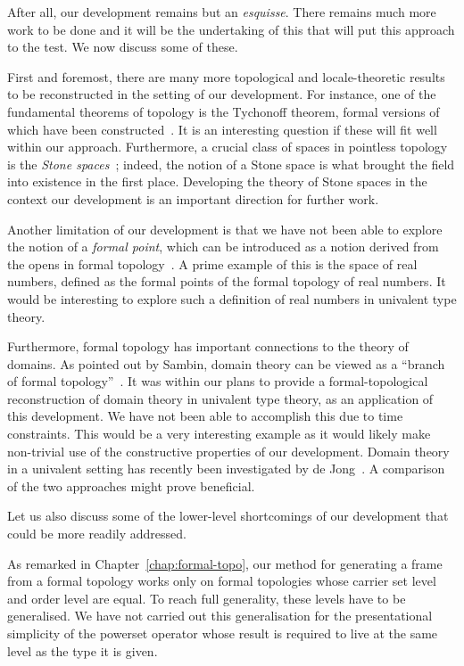 After all, our development remains but an \emph{esquisse}. There remains much more work to
be done and it will be the undertaking of this that will put this approach to the test. We
now discuss some of these.

First and foremost, there are many more topological and locale-theoretic results to be
reconstructed in the setting of our development. For instance, one of the fundamental
theorems of topology is the Tychonoff theorem, formal versions of which have been
constructed~\cite{coq-tychonoff}. It is an interesting question if these will fit well
within our approach. Furthermore, a crucial class of spaces in pointless topology is the
\emph{Stone spaces}~\cite{stone-spaces}; indeed, the notion of a Stone space is what
brought the field into existence in the first place. Developing the theory of Stone spaces
in the context our development is an important direction for further work.

Another limitation of our development is that we have not been able to explore the notion
of a \emph{formal point}, which can be introduced as a notion derived from the opens in
formal topology~\cite[pg.~94]{coq-sambin}. A prime example of this is the space of real
numbers, defined as the formal points of the formal topology of real numbers. It would be
interesting to explore such a definition of real numbers in univalent type theory.

Furthermore, formal topology has important connections to the theory of domains. As
pointed out by Sambin, domain theory can be viewed as a ``branch of formal
topology''~\cite{sambin-domains}. It was within our plans to provide a formal-topological
reconstruction of domain theory in univalent type theory, as an application of this
development. We have not been able to accomplish this due to time constraints. This would
be a very interesting example as it would likely make non-trivial use of the constructive
properties of our development. Domain theory in a univalent setting has recently been
investigated by de Jong~\cite{de-jong-domains}. A comparison of the two approaches might
prove beneficial.

Let us also discuss some of the lower-level shortcomings of our development that could be
more readily addressed.

As remarked in Chapter~\ref{chap:formal-topo}, our method for generating a frame from a
formal topology works only on formal topologies whose carrier set level and order level
are equal. To reach full generality, these levels have to be generalised. We have not
carried out this generalisation for the presentational simplicity of the powerset operator
whose result is required to live at the same level as the type it is given.

